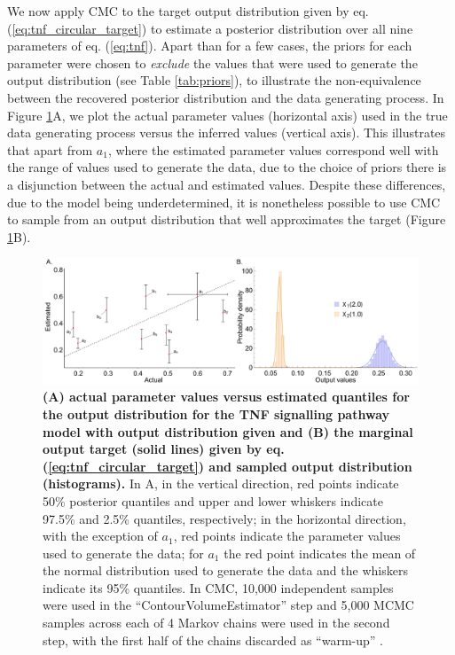 We now apply CMC to the target output distribution given by eq. (\ref{eq:tnf_circular_target}) to estimate a posterior distribution over all nine parameters of eq. (\ref{eq:tnf}). Apart than for a few cases, the priors for each parameter were chosen to \emph{exclude} the values that were used to generate the output distribution (see Table \ref{tab:priors}), to illustrate the non-equivalence between the recovered posterior distribution and the data generating process. In Figure \ref{fig:tnf_circular_versus}A, we plot the actual parameter values (horizontal axis) used in the true data generating process versus the inferred values (vertical axis). This illustrates that apart from $a_1$, where the estimated parameter values correspond well with the range of values used to generate the data, due to the choice of priors there is a disjunction between the actual and estimated values. Despite these differences, due to the model being underdetermined, it is nonetheless possible to use CMC to sample from an output distribution that well approximates the target (Figure \ref{fig:tnf_circular_versus}B).


\begin{figure}[H]
\centerline{\includegraphics[width=1.5\textwidth]{../figures/tnf_circular_both.pdf}}
\caption{\textbf{(A) actual parameter values versus estimated quantiles for the output distribution for the TNF signalling pathway model with output distribution given and (B) the marginal output target (solid lines) given by eq. (\ref{eq:tnf_circular_target}) and sampled output distribution (histograms).} In A, in the vertical direction, red points indicate 50\% posterior quantiles and upper and lower whiskers indicate 97.5\% and 2.5\% quantiles, respectively; in the horizontal direction, with the exception of $a_1$, red points indicate the parameter values used to generate the data; for $a_1$ the red point indicates the mean of the normal distribution used to generate the data and the whiskers indicate its 95\% quantiles. In CMC, 10,000 independent samples were used in the ``ContourVolumeEstimator'' step and 5,000 MCMC samples across each of 4 Markov chains were used in the second step, with the first half of the chains discarded as ``warm-up'' \cite{lambert2018Student}.}
	\label{fig:tnf_circular_versus}
\end{figure}

